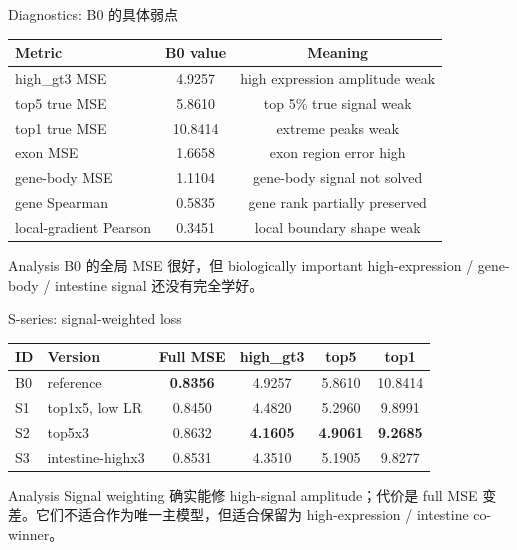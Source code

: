 \documentclass[UTF8,aspectratio=169,10pt]{ctexbeamer}
\begin{document}
\begin{frame}{Diagnostics: B0 的具体弱点}
  \centering
  \begin{tabular}{lcc}
    \toprule
    Metric & B0 value & Meaning \\
    \midrule
    high\_gt3 MSE & 4.9257 & high expression amplitude weak \\
    top5 true MSE & 5.8610 & top 5\% true signal weak \\
    top1 true MSE & 10.8414 & extreme peaks weak \\
    exon MSE & 1.6658 & exon region error high \\
    gene-body MSE & 1.1104 & gene-body signal not solved \\
    gene Spearman & 0.5835 & gene rank partially preserved \\
    local-gradient Pearson & 0.3451 & local boundary shape weak \\
    \bottomrule
  \end{tabular}

  \vspace{0.8em}
  \begin{block}{Analysis}
    B0 的全局 MSE 很好，但 biologically important high-expression / gene-body / intestine signal 还没有完全学好。
  \end{block}
\end{frame}

\begin{frame}{S-series: signal-weighted loss}
  \centering
  \begin{tabular}{llcccc}
    \toprule
    ID & Version & Full MSE & high\_gt3 & top5 & top1 \\
    \midrule
    B0 & reference & \textbf{0.8356} & 4.9257 & 5.8610 & 10.8414 \\
    S1 & top1x5, low LR & 0.8450 & 4.4820 & 5.2960 & 9.8991 \\
    S2 & top5x3 & 0.8632 & \textbf{4.1605} & \textbf{4.9061} & \textbf{9.2685} \\
    S3 & intestine-highx3 & 0.8531 & 4.3510 & 5.1905 & 9.8277 \\
    \bottomrule
  \end{tabular}

  \vspace{0.8em}
  \begin{block}{Analysis}
    Signal weighting 确实能修 high-signal amplitude；代价是 full MSE 变差。它们不适合作为唯一主模型，但适合保留为 high-expression / intestine co-winner。
  \end{block}
\end{frame}
\end{document}
